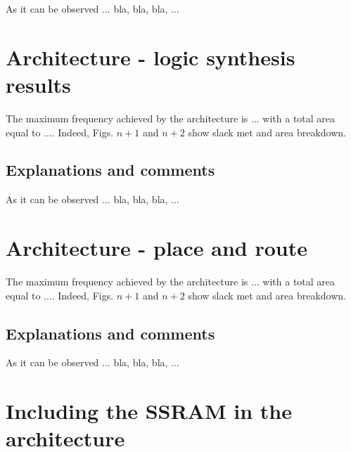 As it can be observed ... bla, bla, bla, ...

\section{Architecture - logic synthesis results}

The maximum frequency achieved by the architecture is ... with a total area equal to ....
Indeed, Figs. $n+1$ and $n+2$ show slack met and area breakdown.

\subsection{Explanations and comments}

As it can be observed ... bla, bla, bla, ...

\section{Architecture - place and route}

The maximum frequency achieved by the architecture is ... with a total area equal to ....
Indeed, Figs. $n+1$ and $n+2$ show slack met and area breakdown.

\subsection{Explanations and comments}

As it can be observed ... bla, bla, bla, ...



\section{Including the SSRAM in the architecture}

